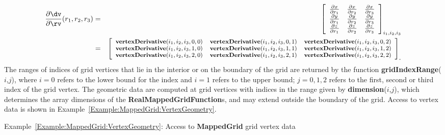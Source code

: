 \documentclass{article}
\begin{document}
\begin{eqnarray*}
    {\partial\dv\over\partial\rv}(r_1,r_2,r_3) & = &
      \left[\begin{array}{ccc}
        \partial x\over\partial r_1 & \partial x\over\partial r_2 & \partial x\over\partial r_3 \\
        \partial y\over\partial r_1 & \partial y\over\partial r_2 & \partial y\over\partial r_3 \\
        \partial z\over\partial r_1 & \partial z\over\partial r_2 & \partial z\over\partial r_3 \\
      \end{array}\right]_{i_1,i_2,i_3} \\ & = &
      \left[{\footnotesize\begin{array}{ccc}
        \textbf{vertexDerivative}(i_1,i_2,i_3,0,0) &
        \textbf{vertexDerivative}(i_1,i_2,i_3,0,1) &
        \textbf{vertexDerivative}(i_1,i_2,i_3,0,2) \\
        \textbf{vertexDerivative}(i_1,i_2,i_3,1,0) &
        \textbf{vertexDerivative}(i_1,i_2,i_3,1,1) &
        \textbf{vertexDerivative}(i_1,i_2,i_3,1,2) \\
        \textbf{vertexDerivative}(i_1,i_2,i_3,2,0) &
        \textbf{vertexDerivative}(i_1,i_2,i_3,2,1) &
        \textbf{vertexDerivative}(i_1,i_2,i_3,2,2) \\
      \end{array}}\right]_{\mbox{.}} 
\end{eqnarray*}
The ranges of indices of grid vertices that lie in the
interior or on the boundary of the grid are returned by the function
\textbf{gridIndexRange}($i$,$j$), where $i = 0$ refers to the lower bound
for the index and $i = 1$ refers to the upper bound; $j = 0,1,2$ refers to the
first, second or third index of the grid vertex.  The geometric data are
computed at grid vertices with indices in the range given by
\textbf{dimension}($i$,$j$), which determines the array dimensions of the
\textbf{RealMappedGridFunction}s, and may extend outside the boundary of
the grid.  Access to vertex data is shown in
Example~\ref{Example:MappedGrid:VertexGeometry}.

{\small
{}
}
{\center Example~\ref{Example:MappedGrid:VertexGeometry}: Access to \textbf{MappedGrid} grid vertex data\label{Example:MappedGrid:VertexGeometry}}
\end{document}
